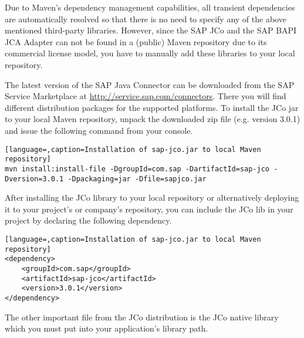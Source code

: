 Due to Maven's dependency management capabilities, all transient dependencies are automatically resolved so that there is no need to specify any of the above mentioned third-party libraries. However, since the SAP JCo and the SAP BAPI JCA Adapter can not be found in a (public) Maven repository due to its commercial license model, you have to manually add these libraries to your local repository.

The latest version of the SAP Java Connector can be downloaded from the SAP Service Marketplace at 
\url{http://service.sap.com/connectors}. There you will find different distribution packages for the supported platforms.
To install the JCo jar to your local Maven repository, unpack the downloaded zip file (e.g. version 3.0.1) and 
issue the following command from your console.

\begin{lstlisting}[language=,caption=Installation of sap-jco.jar to local Maven repository]
mvn install:install-file -DgroupId=com.sap -DartifactId=sap-jco -Dversion=3.0.1 -Dpackaging=jar -Dfile=sapjco.jar
\end{lstlisting}

After installing the JCo library to your local repository or alternatively deploying it to your project's or company's repository, you can include the JCo lib in your project by declaring the following dependency.

\begin{lstlisting}[language=,caption=Installation of sap-jco.jar to local Maven repository]
<dependency>
    <groupId>com.sap</groupId>
    <artifactId>sap-jco</artifactId>
    <version>3.0.1</version>
</dependency>
\end{lstlisting}


The other important file from the JCo distribution is the JCo native library which you must put into your application's library path.
